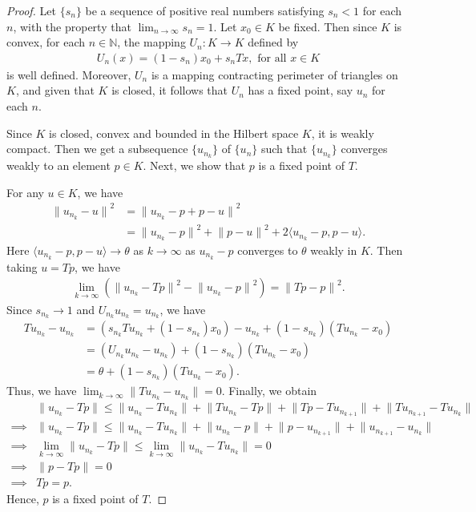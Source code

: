 \documentclass[11pt,reqno]{amsart}
\theoremstyle{definition}
\newtheorem{Open Prob}[theorem]{Open Problem}
\theoremstyle{remark}
\numberwithin{equation}{section}
\begin{document}
\begin{proof}
Let $\{s_n\}$ be a sequence of positive real numbers satisfying $s_n < 1$ for each $n$, with the property that $\lim_{n \to \infty} s_n = 1$.
Let $x_0 \in K$  be fixed. Then since $K$ is convex, for each $n\in \mathbb{N}$, the mapping  $U_n: K \to K$ defined by 
\begin{align*}
U_n(x)= (1-s_n)x_0 +s_nTx, \text{ for all } x \in K
\end{align*} is well defined. Moreover, $U_n$ is a mapping contracting perimeter of triangles on $K$, and given that $K$ is closed, it follows that $U_n$ has a fixed point, say $u_n$ for each $n$.

Since $K$ is closed, convex and bounded in the Hilbert space $K$, it is weakly compact. Then we  get a subsequence $\{u_{n_k}\}$ of $\{u_n\}$ such that $\{u_{n_k}\}$ converges weakly to an element $p \in K$. Next, we show that $p$ is a fixed point of $T$.

For any  $u \in K$, we have 
\begin{align*}
{\lVert u_{n_k} - u \rVert}^2 
&= {\lVert u_{n_k} -p + p - u \rVert}^2\\
&= {\lVert u_{n_k} - p \rVert}^2 + {\lVert p - u \rVert}^2 + 2\langle u_{n_k} -p, p-u \rangle.
\end{align*}
Here $\langle u_{n_k} -p, p-u \rangle \to \theta$ as $k \to \infty$ as $u_{n_k} - p$ converges to $\theta$ weakly in $K$.
Then taking $u=Tp$, we have
\begin{align*}
\lim_{k \to \infty} ({\lVert u_{n_k} - Tp \rVert}^2 - {\lVert u_{n_k} - p \rVert}^2) = {\lVert Tp - p \rVert}^2.
\end{align*}
Since $s_{n_k} \to 1$ and $U_{n_k}u_{n_k}=u_{n_k}$, we have
\begin{align*}
Tu_{n_k} - u_{n_k} &= (s_{n_k} Tu_{n_k}+ (1-s_{n_k})x_0) - u_{n_k} + (1-s_{n_k})(Tu_{n_k} - x_0)\\
&=(U_{n_k}u_{n_k} -u_{n_k}) + (1-s_{n_k})(Tu_{n_k} - x_0)\\
&=\theta + (1- s_{n_k})(Tu_{n_k} - x_0). 
\end{align*}
Thus, we have $\lim_{k \to \infty} \lVert Tu_{n_k} - u_{n_k} \rVert =0$.
Finally, we obtain
\begin{align*}
&\lVert u_{n_k} - Tp \rVert \le \lVert u_{n_k} - Tu_{n_k} \rVert+ \lVert Tu_{n_k} - Tp \rVert + \lVert Tp - Tu_{n_{k+1}} \rVert+ \lVert Tu_{n_{k+1}} - Tu_{n_k} \rVert\\
\implies &\lVert u_{n_k} - Tp \rVert \le \lVert u_{n_k} - Tu_{n_k} \rVert+ \lVert u_{n_k} - p \rVert + \lVert p - u_{n_{k+1}} \rVert+ \lVert u_{n_{k+1}} - u_{n_k} \rVert\\
\implies & \lim_{k \to \infty} \lVert u_{n_k} - Tp \rVert \le \lim_{k \to \infty} \lVert u_{n_k} - Tu_{n_k} \rVert =0\\
\implies & \lVert p - Tp \rVert =0\\
\implies &Tp=p.
\end{align*}
Hence, $p$ is a fixed point of $T$.
\end{proof}
\end{document}
